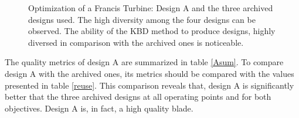 \begin{figure}[h!]
\begin{minipage}[b]{1\linewidth}
 \centering
\end{minipage}
\caption{Optimization of a Francis Turbine: Design A and the three archived designs used. The high diversity among the four designs can be observed. The ability of the KBD method to produce designs, highly diversed in comparison with the archived ones is noticeable.}
\label{design-bases-a}
\end{figure}

The quality metrics of design A are summarized in table \ref{Asum}. To compare design A with the archived ones, its metrics should be compared with the values presented in table \ref{reuse}. This comparison reveals that, design A is significantly better that the three archived designs at all operating points and for both objectives. Design A is, in fact, a high quality blade.


